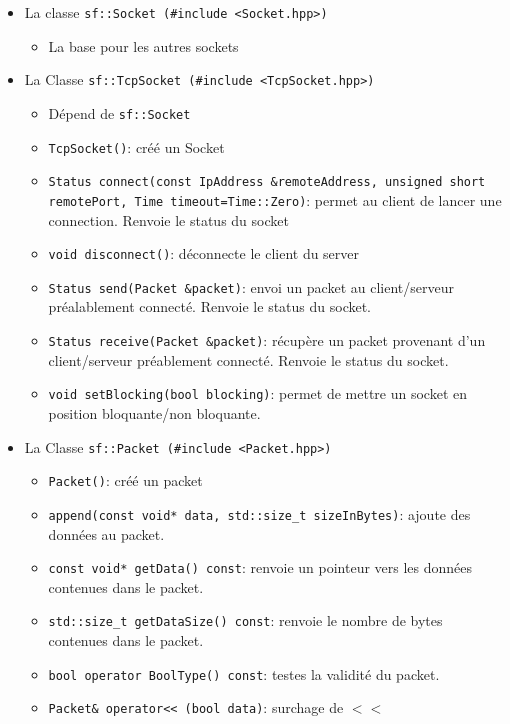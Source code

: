 \documentclass[12pt,a4paper,twoside]{article}
\begin{document}
    \begin{itemize}
    	\item{} La classe \lstinline$sf::Socket (#include <Socket.hpp>)$
    	\begin{itemize}
    		\item{} La base pour les autres sockets
    	\end{itemize}
    	\item{} La Classe \lstinline$sf::TcpSocket (#include <TcpSocket.hpp>)$
    	\begin{itemize}
    		\item{} Dépend de \lstinline$sf::Socket$
    		\item{} \lstinline$TcpSocket()$\;: créé un Socket
    		\item{} \lstinline$Status connect(const IpAddress &remoteAddress, unsigned short remotePort, Time timeout=Time::Zero)$\;: permet au client de lancer une connection. Renvoie le status du socket
    		\item{} \lstinline$void disconnect()$\;: déconnecte le client du server
    		\item{} \lstinline$Status send(Packet &packet)$\;: envoi un packet au client/serveur préalablement connecté. Renvoie le status du socket.
    		\item{} \lstinline$Status receive(Packet &packet)$\;: récupère un packet provenant d'un client/serveur préablement connecté. Renvoie le status du socket.
    		\item{} \lstinline$void setBlocking(bool blocking)$\;: permet de mettre un socket en position bloquante/non bloquante.
    	\end{itemize}
    	\item{} La Classe \lstinline$sf::Packet (#include <Packet.hpp>)$
        \begin{itemize}
            \item{} \lstinline$Packet()$\;: créé un packet
            \item{} \lstinline$append(const void* data, std::size_t sizeInBytes)$\;: ajoute des données au packet.
            \item{} \lstinline$const void* getData() const$\;: renvoie un pointeur vers les données contenues dans le packet.
            \item{} \lstinline$std::size_t getDataSize() const$\;: renvoie le nombre de bytes contenues dans le packet.
            \item{} \lstinline$bool operator BoolType() const$\;: testes la validité du packet.
            \item{} \lstinline$Packet& operator<< (bool data)$\;: surchage de $<<$

\end{itemize}
\end{itemize}
\end{document}
